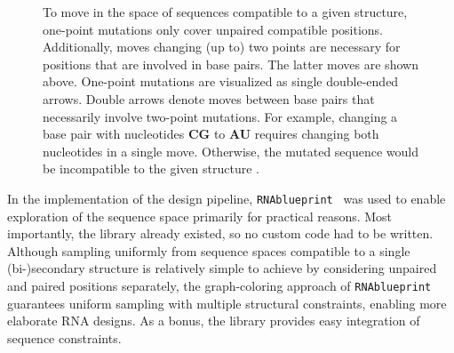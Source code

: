 \documentclass[../../master.tex]{subfiles}
\begin{document}
\begin{figure}[!ht]
	\centering
	\caption[Move Set in Space of Compatible Sequences]{
		To move in the space of sequences compatible to a given structure, one-point mutations only cover unpaired compatible positions.
		Additionally, moves changing (up to) two points are necessary for positions that are involved in base pairs. 
		The latter moves are shown above. 
		One-point mutations are visualized as single double-ended arrows.
		Double arrows denote moves between base pairs that necessarily involve two-point mutations.
		For example, changing a base pair with nucleotides \textbf{CG} to \textbf{AU} requires changing both nucleotides in a single move.
		Otherwise, the mutated sequence would be incompatible to the given structure \parencite{haslinger_rna_1999}.
	}\label{fig:compatiblemoves}
\end{figure}

In the implementation of the design pipeline, \texttt{RNAblueprint}~\parencite{hammer_rnablueprint_2017} was used to enable exploration of the sequence space primarily for practical reasons.
Most importantly, the library already existed, so no custom code had to be written.
Although sampling uniformly from sequence spaces compatible to a single (bi-)secondary structure is relatively simple to achieve by considering unpaired and paired positions separately, the graph-coloring approach of \texttt{RNAblueprint} guarantees uniform sampling with multiple structural constraints, enabling more elaborate RNA designs.
As a bonus, the library provides easy integration of sequence constraints.
\end{document}
